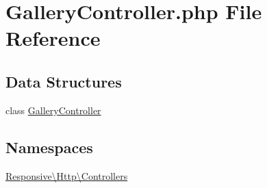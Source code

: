 \hypertarget{_gallery_controller_8php}{}\section{Gallery\+Controller.\+php File Reference}
\label{_gallery_controller_8php}
\subsection*{Data Structures}
\begin{DoxyCompactItemize}
\item 
class \mbox{\hyperlink{class_responsive_1_1_http_1_1_controllers_1_1_gallery_controller}{Gallery\+Controller}}
\end{DoxyCompactItemize}
\subsection*{Namespaces}
\begin{DoxyCompactItemize}
\item 
 \mbox{\hyperlink{namespace_responsive_1_1_http_1_1_controllers}{Responsive\textbackslash{}\+Http\textbackslash{}\+Controllers}}
\end{DoxyCompactItemize}
